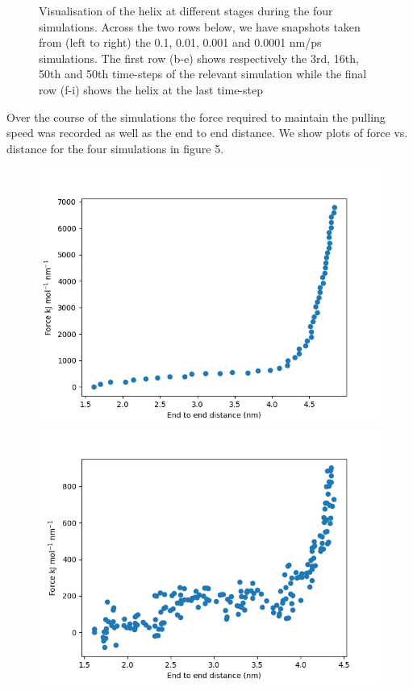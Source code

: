\documentclass[12pt, onecolumn]{revtex4}    %
\begin{document}
\begin{figure}[h!]
\caption{Visualisation of the helix at different stages during the four simulations.  Across the two rows below, we have snapshots taken from (left to right) the 0.1, 0.01, 0.001 and 0.0001 nm/ps simulations.  The first row (b-e) shows respectively the 3rd, 16th, 50th and 50th time-steps of the relevant simulation while the final row (f-i) shows the helix at the last time-step}
\end{figure}

Over the course of the simulations the force required to maintain the pulling speed was recorded as well as the end to end distance.  We show plots of force vs. distance for the four simulations in figure 5.\\

\begin{figure}[h!]
\label{fig: FDs}
\includegraphics[scale=0.4]{FD0_1}
\includegraphics[scale=0.4]{FD0_01}

\end{figure}
\end{document}
